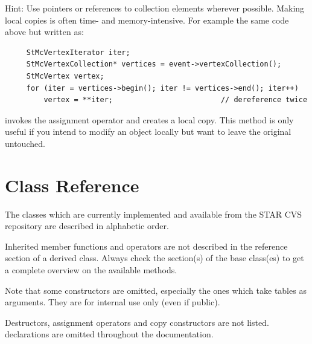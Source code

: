 Hint: Use pointers or references to collection elements wherever
possible.  Making local copies is often time- and memory-intensive.
For example the same code above but written as:
\begin{verbatim}
     StMcVertexIterator iter;
     StMcVertexCollection* vertices = event->vertexCollection();
     StMcVertex vertex;
     for (iter = vertices->begin(); iter != vertices->end(); iter++)
         vertex = **iter;                         // dereference twice
\end{verbatim}
invokes the  assignment operator and creates a local copy.
This method is only useful if you intend to modify an object locally
but want to leave the original untouched.

\newpage


\section{Class Reference}
The classes which are currently implemented and available from the
STAR CVS repository are described in alphabetic order.

Inherited member functions and operators are not described in the
reference section of a derived class. Always check the section(s)
of the base class(es) to get a complete overview on the available
methods.

Note that some constructors are omitted, especially the ones which
take tables as arguments. They are for internal use only (even if
public).

Destructors, assignment operators and copy constructors are not
listed.   declarations are omitted throughout the
documentation.

\clearpage


%
%
